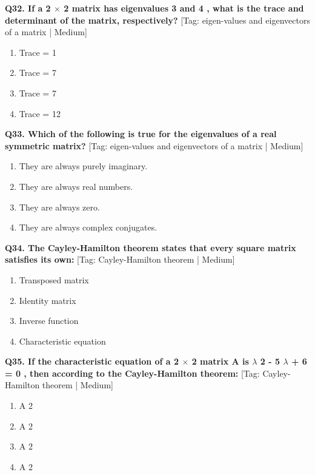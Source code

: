 \noindent\textbf{Q32. If a 2 $\times$ 2 matrix has eigenvalues 3 and 4 , what is the trace and determinant of the matrix, respectively?} \hfill [Tag: eigen-values and eigenvectors of a matrix | Medium]
\begin{enumerate}[label=(\alph*),topsep=2pt,itemsep=1pt,partopsep=0pt,parsep=0pt]
    \item {{Trace = 1}}
    \item {{Trace = 7}}
    \item {{Trace = 7}}
    \item {{Trace = 12}}
\end{enumerate}
\vspace{2mm}

\noindent\textbf{Q33. Which of the following is true for the eigenvalues of a real symmetric matrix?} \hfill [Tag: eigen-values and eigenvectors of a matrix | Medium]
\begin{enumerate}[label=(\alph*),topsep=2pt,itemsep=1pt,partopsep=0pt,parsep=0pt]
    \item {{They are always purely imaginary.}}
    \item {{They are always real numbers.}}
    \item {{They are always zero.}}
    \item {{They are always complex conjugates.}}
\end{enumerate}
\vspace{2mm}

\noindent\textbf{Q34. The Cayley-Hamilton theorem states that every square matrix satisfies its own:} \hfill [Tag: Cayley-Hamilton theorem | Medium]
\begin{enumerate}[label=(\alph*),topsep=2pt,itemsep=1pt,partopsep=0pt,parsep=0pt]
    \item {{Transposed matrix}}
    \item {{Identity matrix}}
    \item {{Inverse function}}
    \item {{Characteristic equation}}
\end{enumerate}
\vspace{2mm}

\noindent\textbf{Q35. If the characteristic equation of a 2 $\times$ 2 matrix A is $\lambda$ 2 - 5 $\lambda$ + 6 = 0 , then according to the Cayley-Hamilton theorem:} \hfill [Tag: Cayley-Hamilton theorem | Medium]
\begin{enumerate}[label=(\alph*),topsep=2pt,itemsep=1pt,partopsep=0pt,parsep=0pt]
    \item {{A 2}}
    \item {{A 2}}
    \item {{A 2}}
    \item {{A 2}}
\end{enumerate}
\vspace{2mm}

